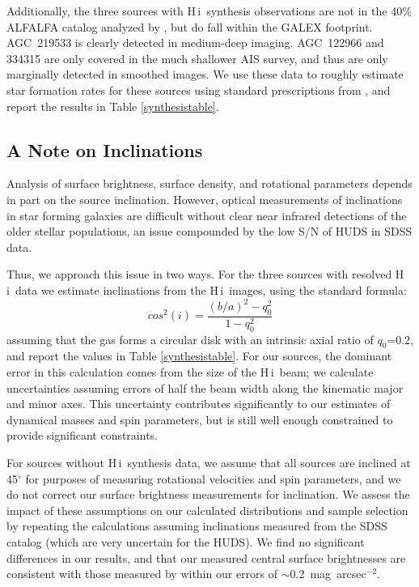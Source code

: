 \documentclass[twocolumn]{aastex6}
\newcommand{\hi}{H{\sc\,i}}
\begin{document}
Additionally, the three sources with \hi\ synthesis observations are not in the 40\% ALFALFA catalog analyzed by \cite{huang12b}, but do fall within the GALEX footprint. AGC~219533 is clearly detected in medium-deep imaging. %
AGC~122966 and 334315 are only covered in the much shallower AIS survey, and thus are only marginally detected in smoothed images. %
We use these data to roughly estimate star formation rates for these sources using standard prescriptions from \cite{kennicutt12a}, and report the results in Table \ref{synthesistable}.


\subsection{A Note on Inclinations}
\label{data.inc}

Analysis of surface brightness, surface density, and rotational parameters depends in part on the source inclination. However, optical measurements of inclinations in star forming galaxies are difficult without clear near infrared detections of the older stellar populations, an issue compounded by the low S/N of HUDS in SDSS data. 

Thus, we approach this issue in two ways. For the three sources with resolved \hi\ data we estimate inclinations from the \hi\ images, using the standard formula:
$$cos^2(i) = \frac{(b/a)^2-q_0^2}{1-q_0^2}$$
assuming that the gas forms a circular disk with an intrinsic axial ratio of $q_0$=0.2, and report the values in Table \ref{synthesistable}. For our sources, the dominant error in this calculation comes from the size of the \hi\ beam; we calculate uncertainties assuming errors of half the beam width along the kinematic major and minor axes. This uncertainty contributes significantly to our estimates of dynamical masses and spin parameters, but is still well enough constrained to provide
 significant constraints.

For sources without \hi\ synthesis data, we assume that all sources are inclined at 45$^{\circ}$ for purposes of measuring rotational velocities and spin parameters, and we do not correct our surface brightness measurements for inclination. We assess the impact of these assumptions on our calculated distributions and sample selection by repeating the calculations assuming inclinations measured from the SDSS catalog (which are very uncertain for the HUDS). 
We find no significant differences in our results, and that our measured central surface brightnesses are consistent with those measured by \cite{vandokkum15a} within our errors of $\sim$0.2~mag~arcsec$^{-2}$.
\end{document}
